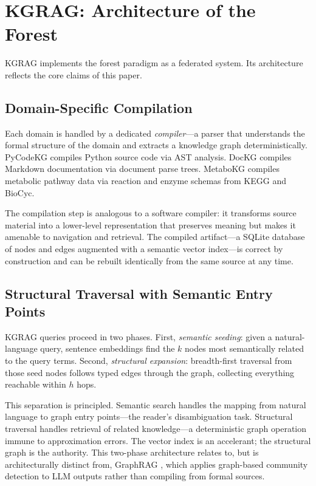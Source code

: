 \documentclass{article}
\begin{document}
\section{KGRAG: Architecture of the Forest}

KGRAG implements the forest paradigm as a federated system.  Its architecture
reflects the core claims of this paper.

\subsection{Domain-Specific Compilation}

Each domain is handled by a dedicated \emph{compiler}---a parser that understands
the formal structure of the domain and extracts a knowledge graph deterministically.
PyCodeKG compiles Python source code via AST analysis.  DocKG compiles Markdown
documentation via document parse trees.  MetaboKG compiles metabolic pathway data
via reaction and enzyme schemas from KEGG and BioCyc.

The compilation step is analogous to a software compiler: it transforms source
material into a lower-level representation that preserves meaning but makes it
amenable to navigation and retrieval.  The compiled artifact---a SQLite database
of nodes and edges augmented with a semantic vector index---is correct by
construction and can be rebuilt identically from the same source at any time.

\subsection{Structural Traversal with Semantic Entry Points}

KGRAG queries proceed in two phases.  First, \emph{semantic seeding}: given a
natural-language query, sentence embeddings find the $k$ nodes most semantically
related to the query terms.  Second, \emph{structural expansion}: breadth-first
traversal from those seed nodes follows typed edges through the graph, collecting
everything reachable within $h$ hops.

This separation is principled.  Semantic search handles the mapping from
natural language to graph entry points---the reader's disambiguation task.
Structural traversal handles retrieval of related knowledge---a deterministic
graph operation immune to approximation errors.  The vector index is an
accelerant; the structural graph is the authority.  This two-phase architecture
relates to, but is architecturally distinct from, GraphRAG
\cite{edge2024graphrag}, which applies graph-based community detection to LLM
outputs rather than compiling from formal sources.
\end{document}
